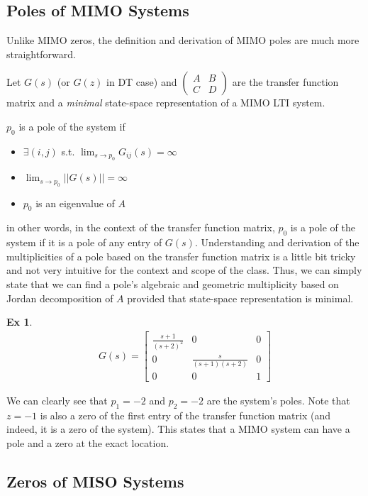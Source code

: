 \documentclass[twoside]{article}
\newtheorem{exmp}[theorem]{Ex}
\begin{document}
\newpage

\subsection{Poles of MIMO Systems}

Unlike MIMO zeros, the definition and derivation of MIMO poles are much more straightforward. 

Let $G(s)$ (or $G(z)$ in DT case) and $\left( \begin{array}{c|c} A & B \\ \hline C & D  \end{array} \right)$ are the transfer function matrix and a \textit{minimal} state-space representation of a MIMO LTI system.

$p_0$ is a pole of the system if 
%
\begin{itemize}
 \item $\exists (i,j)$ s.t. $\lim_{s \to p_0}G_{ij}(s) = \infty$
 \item $\lim_{s \to p_0} || G(s) || = \infty$
 \item $p_0$ is an eigenvalue of $A$
\end{itemize}
%
in other words, in the context of the transfer function matrix, $p_0$ is a pole of the system if it is a pole of any entry of
$G(s)$. Understanding and derivation of the multiplicities of a pole based on the transfer function matrix is a little bit tricky 
and not very intuitive for the context and scope of the class. Thus, we can simply state that we can find a pole's algebraic and
geometric multiplicity based on Jordan decomposition of $A$ provided that state-space representation is minimal. 
%
\begin{exmp}
	\begin{align*}
	G(s) = \left[ \begin{array}{ccc} \frac{s+1}{(s+2)^2} & 0 & 0 \\  
	0 & \frac{s}{(s+1)(s+2)} & 0 \\ 0 & 0 & 1  \end{array} \right]
	\end{align*}
\end{exmp}
%
We can clearly see that $p_1 = -2$ and $p_2 = -2$ are the system's poles. Note that $z = -1$ is also a zero of the 
first entry of the transfer function matrix (and indeed, it is a zero of the system). This states that a MIMO system can have 
a pole and a zero at the exact location. 

\subsection{Zeros of MISO Systems}
\end{document}
